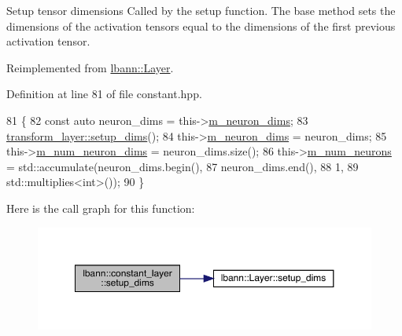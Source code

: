 Setup tensor dimensions Called by the setup function. The base method sets the dimensions of the activation tensors equal to the dimensions of the first previous activation tensor. 

Reimplemented from \hyperlink{classlbann_1_1Layer_a90fce1b06c1f2abb480e18cfe08a9746}{lbann\+::\+Layer}.



Definition at line 81 of file constant.\+hpp.


\begin{DoxyCode}
81                              \{
82     \textcolor{keyword}{const} \textcolor{keyword}{auto} neuron\_dims = this->\hyperlink{classlbann_1_1Layer_abb34bb8031f57a483e2e327a5f229f48}{m\_neuron\_dims};
83     \hyperlink{classlbann_1_1Layer_a90fce1b06c1f2abb480e18cfe08a9746}{transform\_layer::setup\_dims}();
84     this->\hyperlink{classlbann_1_1Layer_abb34bb8031f57a483e2e327a5f229f48}{m\_neuron\_dims} = neuron\_dims;
85     this->\hyperlink{classlbann_1_1Layer_adfd6178d21498c9095cd947ae1eb2d6a}{m\_num\_neuron\_dims} = neuron\_dims.size();
86     this->\hyperlink{classlbann_1_1Layer_a6b5ebc8a7d9329d8a773ed787e7b41d8}{m\_num\_neurons} = std::accumulate(neuron\_dims.begin(),
87                                           neuron\_dims.end(),
88                                           1,
89                                           std::multiplies<int>());
90   \}
\end{DoxyCode}
Here is the call graph for this function\+:\nopagebreak
\begin{figure}[H]
\begin{center}
\leavevmode
\includegraphics[width=350pt]{classlbann_1_1constant__layer_a147f3510683632f90bd1491f80d8ef32_cgraph}
\end{center}
\end{figure}
\mbox{\label{classlbann_1_1constant__layer_aa3450d358b093a29067500acc0ac4dff}} 
